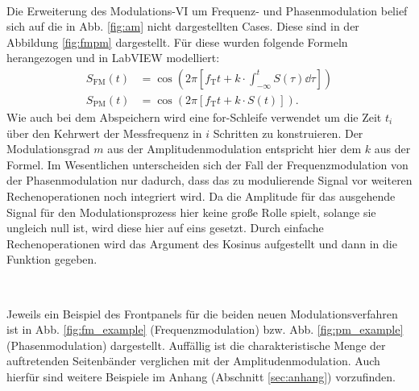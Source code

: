 	\
	
	Die Erweiterung des Modulations-VI um Frequenz- und Phasenmodulation belief sich auf die in Abb. \ref{fig:am} nicht dargestellten Cases.
	Diese sind in der Abbildung \ref{fig:fmpm} dargestellt.
	Für diese wurden folgende Formeln herangezogen und in LabVIEW modelliert:
	\begin{align}
		\label{eq:FM} S_\text{FM}(t) &= \cos{(2\pi[f_\text{T}t + k \cdot \int_{-\infty}^{t}{S(\tau)\dd{\tau}}])} \\
		\label{eq:PM} S_\text{PM}(t) &= \cos{(2\pi[f_\text{T}t + k \cdot S(t)])}.
	\end{align} 
	Wie auch bei dem Abspeichern wird eine for-Schleife verwendet um die Zeit $t_i$ über den Kehrwert der Messfrequenz in $i$ Schritten zu konstruieren.
	Der Modulationsgrad $m$ aus der Amplitudenmodulation entspricht hier dem $k$ aus der Formel.
	Im Wesentlichen unterscheiden sich der Fall der Frequenzmodulation von der Phasenmodulation nur dadurch, dass das zu modulierende Signal vor weiteren Rechenoperationen noch integriert wird.
	Da die Amplitude für das ausgehende Signal für den Modulationsprozess hier keine große Rolle spielt, solange sie ungleich null ist, wird diese hier auf eins gesetzt.
	Durch einfache Rechenoperationen wird das Argument des Kosinus aufgestellt und dann in die Funktion gegeben.
			
	\
		
	Jeweils ein Beispiel des Frontpanels für die beiden neuen Modulationsverfahren ist in Abb. \ref{fig:fm_example} (Frequenzmodulation) bzw. Abb. \ref{fig:pm_example} (Phasenmodulation) dargestellt.
	Auffällig ist die charakteristische Menge der auftretenden Seitenbänder verglichen mit der Amplitudenmodulation.
	Auch hierfür sind weitere Beispiele im Anhang (Abschnitt \ref{sec:anhang}) vorzufinden.
	
